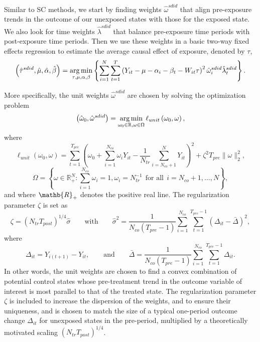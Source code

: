\documentclass[../Main.tex]{subfiles}
\begin{document}
Similar to SC methods, we start by finding weights $\hat{\omega}^{sdid}$ that align pre-exposure trends in the outcome of our unexposed states with those for the exposed state. We also look for time weights $\hat{\lambda}^{sdid}$ that balance pre-exposure time periods with post-exposure time periods. Then we use these weights in a basic two-way fixed effects regression to estimate the average causal effect of exposure, denoted by $\tau$,
\begin{equation} \label{eq:sdid_reg}
    \left(\hat{\tau}^{sdid},\hat{\mu},\hat{\alpha},\hat{\beta}\right)=\operatorname*{arg\,min}_{\tau,\mu,\alpha,\beta}\left\{\sum_{i=1}^N\sum_{t=1}^T\left(Y_{it}-\mu-\alpha_i-\beta_t-W_{it}\tau\right)^2\hat{\omega}_i^{sdid}\hat{\lambda}_t^{sdid}\right\}.
\end{equation}

More specifically, the unit weights $\hat{\omega}^{sdid}$ are chosen by solving the optimization problem
\begin{equation} \label{eq:unit_weights}
    \left(\hat{\omega}_0,\hat{\omega}^{sdid}\right)=\operatorname*{arg\,min}_{\omega_0\in\mathbb{R},\omega\in\Omega}\ell_{unit}\left(\omega_0,\omega\right),
\end{equation}
where
\begin{equation*}
    \ell_{unit}\left(\omega_0,\omega\right)=\sum_{t=1}^{T_{pre}}\left(\omega_0+\sum_{i=1}^{N_{co}}\omega_iY_{it}-\frac{1}{N_{tr}}\sum_{i=N_{co}+1}^NY_{it}\right)^2+\zeta^2T_{pre}\lVert\omega\rVert_2^2,
\end{equation*}
\begin{equation*}
    \Omega=\left\{\omega\in\mathbb{R}_+^N:\sum_{i=1}^{N_{co}}\omega_i=1,\omega_i=N_{tr}^{-1} ~~ \text{for all} ~~ i=N_{co}+1,\dots ,N \right\},
\end{equation*}
and where $\mathb{R}_+$ denotes the positive real line. The regularization parameter $\zeta$ is set as
\begin{equation} \label{eq:regularization}
    \zeta=\left(N_{tr}T_{post}\right)^{1/4}\hat{\sigma}\qquad \text{with} \qquad \hat{\sigma}^2=\frac{1}{N_{co}(T_{pre}-1)}\sum_{i=1}^{N_{co}}\sum_{t=1}^{T_{pre}-1}\left(\Delta_{it}-\bar{\Delta}\right)^2,
\end{equation}
where
\begin{equation*}
    \Delta_{it}=Y_{i(t+1)}-Y_{it},\qquad \text{and} \qquad \bar{\Delta}=\frac{1}{N_{co}(T_{pre}-1)}\sum_{i=1}^{N_{co}}\sum_{t=1}^{T_{pre}-1}\Delta_{it}.
\end{equation*}
In other words, the unit weights are chosen to find a convex combination of potential control states whose pre-treatment trend in the outcome variable of interest is most parallel to that of the treated state. The regularization parameter $\zeta$ is included to increase the dispersion of the weights, and to ensure their uniqueness, and is chosen to match the size of a typical one-period outcome change $\Delta_{it}$ for unexposed states in the pre-period, multiplied by a theoretically motivated scaling $(N_{tr}T_{post})^{1/4}$.
\end{document}
